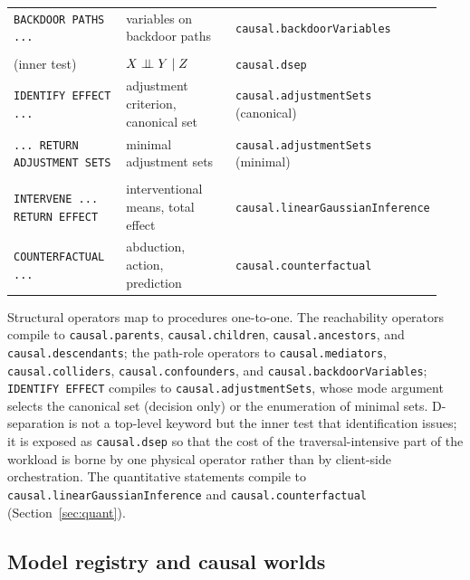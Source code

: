 \begin{table}[t]
\begin{tabular}{@{}p{0.30\linewidth} p{0.34\linewidth} p{0.30\linewidth}@{}}
    \lstinline[style=causaldsl]|BACKDOOR PATHS ...| & variables on backdoor paths & \texttt{causal.backdoorVariables} \\
    \addlinespace[2pt]
    \multicolumn{3}{@{}l}{\textit{Independence and identification}}\\
    (inner test) & $X \perp\!\!\!\perp Y \mid Z$ & \texttt{causal.dsep} \\
    \lstinline[style=causaldsl]|IDENTIFY EFFECT ...| & adjustment criterion, canonical set & \texttt{causal.adjustmentSets} (canonical) \\
    \lstinline[style=causaldsl]|... RETURN ADJUSTMENT SETS| & minimal adjustment sets & \texttt{causal.adjustmentSets} (minimal) \\
    \addlinespace[2pt]
    \multicolumn{3}{@{}l}{\textit{Quantitative}}\\
    \lstinline[style=causaldsl]|INTERVENE ... RETURN EFFECT| & interventional means, total effect & \texttt{causal.linear\allowbreak GaussianInference} \\
    \lstinline[style=causaldsl]|COUNTERFACTUAL ...| & abduction, action, prediction & \texttt{causal.counterfactual} \\
    \bottomrule
  \end{tabular}
\end{table}

Structural operators map to procedures one-to-one. The reachability operators
compile to \texttt{causal.parents}, \texttt{causal.children},
\texttt{causal.ancestors}, and \texttt{causal.descendants}; the path-role
operators to \texttt{causal.mediators}, \texttt{causal.colliders},
\texttt{causal.confounders}, and \texttt{causal.backdoorVariables};
\lstinline[style=causaldsl]|IDENTIFY EFFECT| compiles to
\texttt{causal.adjustmentSets}, whose mode argument selects the canonical set
(decision only) or the enumeration of minimal sets. D-separation is not a
top-level keyword but the inner test that identification issues; it is exposed
as \texttt{causal.dsep} so that the cost of the traversal-intensive part of
the workload is borne by one physical operator rather than by client-side
orchestration. The quantitative statements compile to
\texttt{causal.linearGaussianInference} and \texttt{causal.counterfactual}
(Section~\ref{sec:quant}).

\subsection{Model registry and causal worlds}\label{sec:lang:registry}

